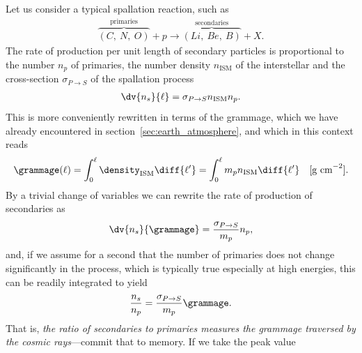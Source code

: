 Let us consider a typical spallation reaction, such as
\begin{align*}
  \overbrace{(C,~N,~O)}^{\text{primaries}} + p \rightarrow
  \overbrace{(Li,~Be,~B)}^{\text{secondaries}} + X.
\end{align*}
The rate of production per unit length of secondary particles is proportional to
the number $n_p$ of primaries, the number density $n_\text{ISM}$ of the interstellar
and the cross-section $\sigma_{P\rightarrow S}$ of the spallation process
\begin{align*}
  \dv{n_s}{\ell} = \sigma_{P\rightarrow S} n_\text{ISM} n_p.
\end{align*}
This is more conveniently rewritten in terms of the grammage, which we have already
encountered in section~\ref{sec:earth_atmosphere}, and which in this context
reads
\begin{align*}
   \grammage(\ell) = \int_0^\ell \density_\text{ISM} \diff{\ell'} =
    \int_0^\ell m_p n_\text{ISM} \diff{\ell'}
    \quad \text{[g~cm}^{-2}\text{]}.
\end{align*}
By a trivial change of variables we can rewrite the rate of production of secondaries as
\begin{align*}
  \dv{n_s}{\grammage} = \frac{\sigma_{P\rightarrow S}}{m_p} n_p,
\end{align*}
and, if we assume for a second that the number of primaries does not change significantly
in the process, which is typically true especially at high energies, this
can be readily integrated to yield
\begin{align}
  \frac{n_s}{n_p} = \frac{\sigma_{P\rightarrow S}}{m_p} \grammage.
\end{align}
That is, \emph{the ratio of secondaries to primaries measures the grammage
traversed by the cosmic rays}---commit that to memory. If we take the peak value
